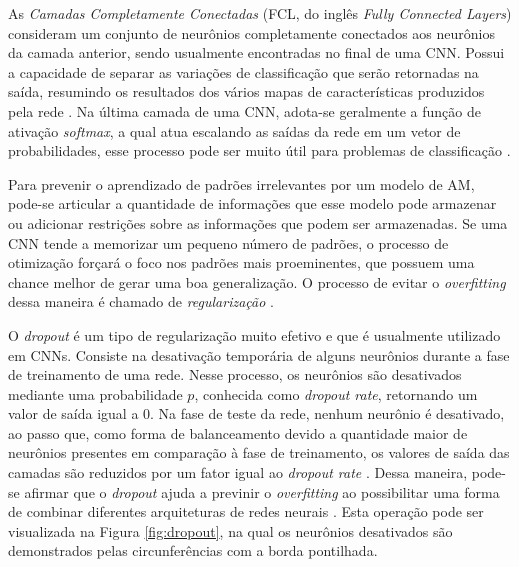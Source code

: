 
As \emph{Camadas Completamente Conectadas} (FCL, do inglês \emph{Fully Connected Layers}) consideram um conjunto de neurônios completamente conectados aos neurônios da camada anterior, sendo usualmente encontradas no final de uma CNN. Possui a capacidade de separar as variações de classificação que serão retornadas na saída, resumindo os resultados dos vários mapas de características produzidos pela rede \cite{khan}. Na última camada de uma CNN, adota-se geralmente a função de ativação \emph{softmax}, a qual atua escalando as saídas da rede em um vetor de probabilidades, esse processo pode ser muito útil para problemas de classificação \cite{gulli}.

Para prevenir o aprendizado de padrões irrelevantes por um modelo de AM, pode-se articular a quantidade de informações que esse modelo pode armazenar ou adicionar restrições sobre as informações que podem ser armazenadas. Se uma CNN tende a memorizar um pequeno número de padrões, o processo de otimização forçará o foco nos padrões mais proeminentes, que possuem uma chance melhor de gerar uma boa generalização. O processo de evitar o \emph{overfitting} dessa maneira é chamado de \emph{regularização} \cite{chollet}.

O \emph{dropout} é um tipo de regularização muito efetivo e que é usualmente utilizado em CNNs. Consiste na desativação temporária de alguns neurônios durante a fase de treinamento de uma rede. Nesse processo, os neurônios são desativados mediante uma probabilidade $p$, conhecida como \emph{dropout rate}, retornando um valor de saída igual a $0$. Na fase de teste da rede, nenhum neurônio é desativado, ao passo que, como forma de balanceamento devido a quantidade maior de neurônios presentes em comparação à fase de treinamento, os valores de saída das camadas são reduzidos por um fator igual ao \emph{dropout rate} \cite{chollet}. Dessa maneira, pode-se afirmar que o \emph{dropout} ajuda a previnir o \emph{overfitting} ao possibilitar uma forma de combinar diferentes arquiteturas de redes neurais \cite{buduma}. Esta operação pode ser visualizada na Figura \ref{fig:dropout}, na qual os neurônios desativados são demonstrados pelas circunferências com a borda pontilhada.

